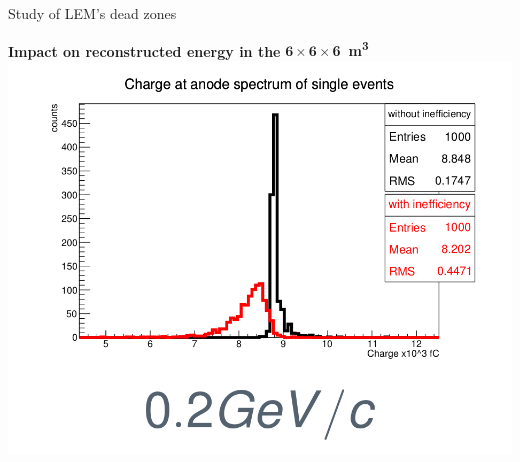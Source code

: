 \documentclass[10pt]{beamer}
\begin{document}
\begin{frame}{Study of LEM's dead zones}
\begin{scriptsize}
\begin{minipage}{0.58\textwidth}
\begin{minipage}{0.48\textwidth}
    			\end{minipage}\hfill
    			\begin{minipage}{0.48\textwidth}
    				\centering
    				\textbf{Impact on reconstructed energy in the} $\mathbf{6 \times 6 \times} $\textbf{\SI[detect-weight]{6}{\meter\cubed}}\\
    				\includegraphics[width=\textwidth]{figures/666/electron.png}
    			\end{minipage}
    		\end{minipage}
    	\end{scriptsize} 
    \end{frame}
\end{document}
